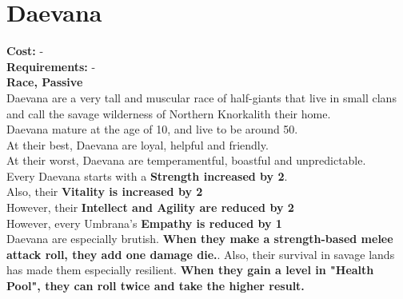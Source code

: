 \section{Daevana}
\textbf{Cost:} -\\
\textbf{Requirements:} -\\
\textbf{Race, Passive}\\
Daevana are a very tall and muscular race of half-giants that live in small clans and call the savage wilderness of Northern Knorkalith their home.\\
Daevana mature at the age of 10, and live to be around 50.\\
At their best, Daevana are loyal, helpful and friendly.\\
At their worst, Daevana are temperamentful, boastful and unpredictable.\\
Every Daevana starts with a \textbf{Strength increased by 2}.\\
Also, their \textbf{Vitality is increased by 2}\\
However, their \textbf{Intellect and Agility are reduced by 2}\\
However, every Umbrana's \textbf{Empathy is reduced by 1}\\
Daevana are especially brutish. \textbf{When they make a strength-based melee attack roll, they add one damage die.}. Also, their survival in savage lands has made them especially resilient. \textbf{When they gain a level in "Health Pool", they can roll twice and take the higher result.}\\